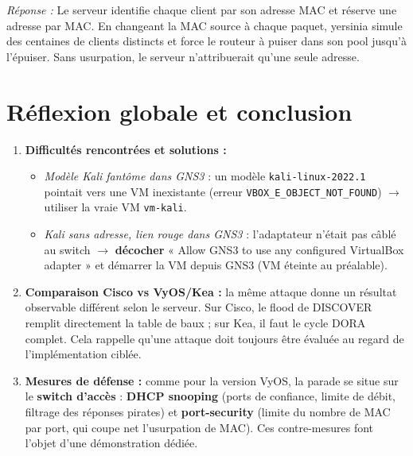 \documentclass[11pt,a4paper]{article}
\begin{document}
\textit{Réponse :} Le serveur identifie chaque client par son adresse MAC et réserve une
adresse par MAC. En changeant la MAC source à chaque paquet, yersinia simule des centaines de
clients distincts et force le routeur à puiser dans son pool jusqu'à l'épuiser. Sans usurpation,
le serveur n'attribuerait qu'une seule adresse.

\section{Réflexion globale et conclusion}
\begin{enumerate}[leftmargin=1.6em]
  \item \textbf{Difficultés rencontrées et solutions :}
  \begin{itemize}[leftmargin=1.2em]
    \item \emph{Modèle Kali fantôme dans GNS3} : un modèle \texttt{kali-linux-2022.1} pointait
          vers une VM inexistante (erreur \texttt{VBOX\_E\_OBJECT\_NOT\_FOUND}) $\rightarrow$
          utiliser la vraie VM \texttt{vm-kali}.
    \item \emph{Kali sans adresse, lien rouge dans GNS3} : l'adaptateur n'était pas câblé au
          switch $\rightarrow$ \textbf{décocher} « Allow GNS3 to use any configured VirtualBox
          adapter » et démarrer la VM depuis GNS3 (VM éteinte au préalable).
  \end{itemize}

  \item \textbf{Comparaison Cisco vs VyOS/Kea :} la même attaque donne un résultat observable
        différent selon le serveur. Sur Cisco, le flood de DISCOVER remplit directement la table
        de baux ; sur Kea, il faut le cycle DORA complet. Cela rappelle qu'une attaque doit
        toujours être évaluée au regard de l'implémentation ciblée.

  \item \textbf{Mesures de défense :} comme pour la version VyOS, la parade se situe sur le
        \textbf{switch d'accès} : \textbf{DHCP snooping} (ports de confiance, limite de débit,
        filtrage des réponses pirates) et \textbf{port-security} (limite du nombre de MAC par
        port, qui coupe net l'usurpation de MAC). Ces contre-mesures font l'objet d'une
        démonstration dédiée.
\end{enumerate}
\end{document}
